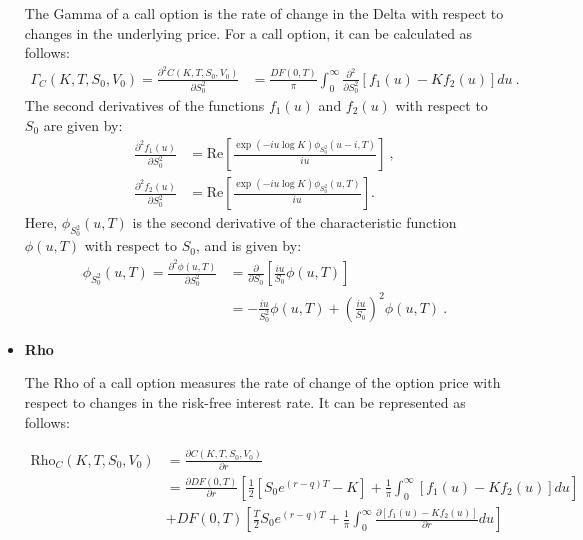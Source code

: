 \begin{itemize}
The Gamma of a call option is the rate of change in the Delta with respect to changes in the underlying price.  For a call option, it can be calculated as follows:
$$
\begin{aligned}
\Gamma_C(K,T, S_0, V_0) =
\frac{ \partial^2 C(K,T, S_0, V_0) }{\partial S_0^2} &=
 \frac{DF(0,T)}{\pi} \int_0^{\infty}\frac{ \partial^2  }{\partial S_0^2}  \left[f_1(u) - Kf_2(u)\right]du \ .
\end{aligned}
$$
The second derivatives of the functions $ f_1(u) $ and $ f_2(u) $ with respect to $ S_0 $ are given by:
\begin{equation}
\label{eq:s-derivative-s0-f1-f2}
\begin{aligned}
\frac{ \partial^2  f_1(u)   }{\partial S_0^2}&= \mathrm{Re}\left[  \frac{\exp(-iu\log K) \phi_{S_0^2}(u-i,T)   }{iu}\right]  \ , \\  
\frac{\partial^2  f_2(u)   }{\partial S_0^2 } &= \mathrm{Re}\left[ \frac{\exp(-iu\log K) \phi_{S_0^2}(u,T)  }{iu}\right].
\end{aligned}
\end{equation}
Here, $\phi_{S_0^2}(u,T)$ is the second derivative of the characteristic function $\phi(u,T)$ with respect to $S_0$, and is given by:
$$
\begin{aligned}
\phi_{S_0^2}(u,T) = \frac{ \partial^2  \phi(u,T)}{\partial S_0^2} &= \frac{\partial}{\partial S_0}  \left[ \frac{iu}{S_0} \phi(u,T)\right] \\ &= -\frac{iu}{S_0^2} \phi(u,T) + \left( \frac{iu}{S_0} \right)^2 \phi(u,T) \ .
\end{aligned}
$$




\item \textbf{Rho}

The Rho of a call option measures the rate of change of the option price with respect to changes in the risk-free interest rate. It can be represented as follows:

$$
\begin{aligned}
\text{Rho}_C(K,T, S_0, V_0) &= 
\frac{ \partial C(K,T, S_0, V_0) }{\partial r} 
\\ &=
\frac{ \partial DF(0,T) }{\partial r} \left[ \frac{1}{2}\left[S_0e^{(r-q) T} - K\right] + \frac{1}{\pi}\int_0^{\infty}\left[f_1(u) - Kf_2(u)\right]du \right]
\\
&+
DF(0,T)\left[ \frac{T}{2} S_0 e^{(r-q) T} +\frac{1} {\pi}\int_0^{\infty}\frac{ \partial \left[f_1(u) - Kf_2(u)\right]}{\partial r}   du \right]
\end{aligned}
$$



\end{itemize}
